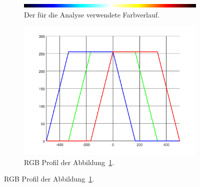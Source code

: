 \begin{figure}
	\centering
	\begin{subfigure}
		\centering
		\includegraphics[width=0.9\linewidth]{cmb/converter/converter-function-strip.png}
		\caption{Der für die Analyse verwendete Farbverlauf.}
		\label{fig:color-strip}
	\end{subfigure}
	\hfill
	\begin{subfigure}
		\centering
		\includegraphics[width=\linewidth]{cmb/converter/converter-function.pdf}
		\caption{RGB Profil der Abbildung~\ref{fig:color-strip}.}
		\label{fig:color-strip-rgb}
	\end{subfigure}
\end{figure}
